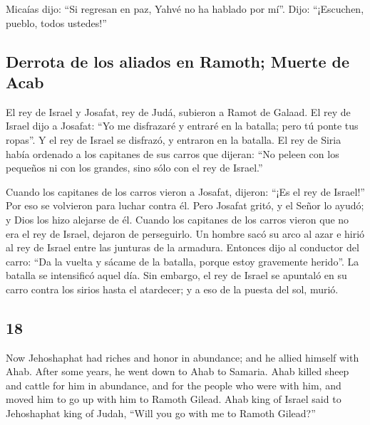 \begin{paracol}{2}
 Micaías dijo: ``Si regresan en paz, Yahvé no ha hablado
por mí''. Dijo: ``¡Escuchen, pueblo, todos ustedes!''

\hypertarget{derrota-de-los-aliados-en-ramoth-muerte-de-acab}{%
\subsection{Derrota de los aliados en Ramoth; Muerte de
Acab}\label{derrota-de-los-aliados-en-ramoth-muerte-de-acab}}

 El rey de Israel y Josafat, rey de Judá, subieron a
Ramot de Galaad.  El rey de Israel dijo a Josafat: ``Yo
me disfrazaré y entraré en la batalla; pero tú ponte tus ropas''. Y el
rey de Israel se disfrazó, y entraron en la batalla.  El
rey de Siria había ordenado a los capitanes de sus carros que dijeran:
``No peleen con los pequeños ni con los grandes, sino sólo con el rey de
Israel.''

 Cuando los capitanes de los carros vieron a Josafat,
dijeron: ``¡Es el rey de Israel!'' Por eso se volvieron para luchar
contra él. Pero Josafat gritó, y el Señor lo ayudó; y Dios los hizo
alejarse de él.  Cuando los capitanes de los carros
vieron que no era el rey de Israel, dejaron de perseguirlo.
 Un hombre sacó su arco al azar e hirió al rey de Israel
entre las junturas de la armadura. Entonces dijo al conductor del carro:
``Da la vuelta y sácame de la batalla, porque estoy gravemente herido''.
 La batalla se intensificó aquel día. Sin embargo, el rey
de Israel se apuntaló en su carro contra los sirios hasta el atardecer;
y a eso de la puesta del sol, murió.

\switchcolumn
\begin{otherlanguage}{english}

\hypertarget{section-35}{%
\section{18}\label{section-35}}

 Now Jehoshaphat had riches and honor in abundance; and he
allied himself with Ahab.  After some years, he went down
to Ahab to Samaria. Ahab killed sheep and cattle for him in abundance,
and for the people who were with him, and moved him to go up with him to
Ramoth Gilead.  Ahab king of Israel said to Jehoshaphat
king of Judah, ``Will you go with me to Ramoth Gilead?''


\end{otherlanguage}
\end{paracol}
